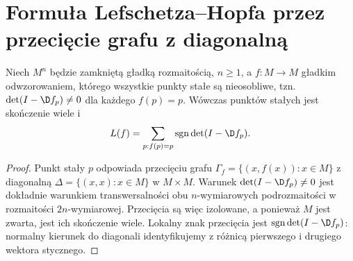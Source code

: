 \section{Formuła Lefschetza--Hopfa przez przecięcie grafu z diagonalną}
\begin{twierdzenie}
\label{thm:lefschetz-hopf-v10}
Niech $M^n$ będzie zamkniętą gładką rozmaitością,
$n\ge1$, a $f:M\to M$ gładkim odwzorowaniem,
którego wszystkie punkty stałe są nieosobliwe,
tzn. $\det(I-\D f_p)\ne0$ dla każdego $f(p)=p$.
Wówczas punktów stałych jest skończenie wiele i
\[
 L(f)=\sum_{p:f(p)=p}\operatorname{sgn}\det(I-\D f_p).
\]
\end{twierdzenie}
\begin{proof}
Punkt stały $p$ odpowiada przecięciu grafu
$\Gamma_f=\{(x,f(x)):x\in M\}$ z diagonalną
$\Delta=\{(x,x):x\in M\}$ w $M\times M$.
Warunek $\det(I-\D f_p)\ne0$ jest dokładnie warunkiem
transwersalności obu $n$-wymiarowych podrozmaitości
w rozmaitości $2n$-wymiarowej. Przecięcia są więc
izolowane, a ponieważ $M$ jest zwarta, jest ich
skończenie wiele. Lokalny znak przecięcia jest
$\operatorname{sgn}\det(I-\D f_p)$: normalny kierunek
do diagonali identyfikujemy z różnicą pierwszego
i drugiego wektora stycznego.


\end{proof}
